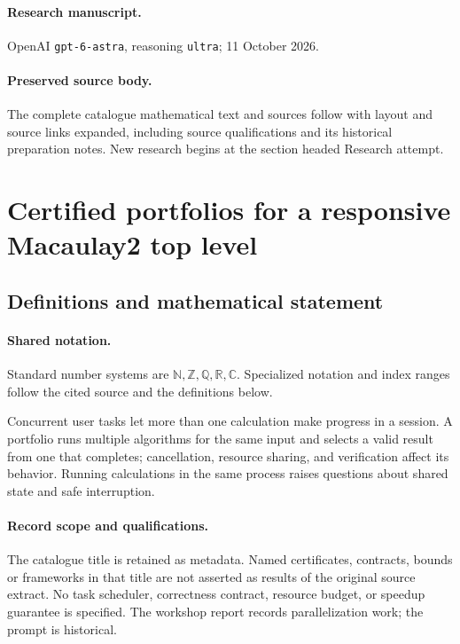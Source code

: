 \documentclass[11pt]{article}
\begin{document}
\paragraph{Research manuscript.} OpenAI \texttt{gpt-6-astra}, reasoning \texttt{ultra}; 11 October 2026.
\paragraph{Preserved source body.} The complete catalogue mathematical text and sources follow with layout and source links expanded, including source qualifications and its historical preparation notes. New research begins at the section headed Research attempt.

\section{Certified portfolios for a responsive Macaulay2 top level}\label{statement}

\subsection{Definitions and mathematical statement}

\paragraph{Shared notation.}Standard number systems are $\mathbb N,\mathbb Z,\mathbb Q,\mathbb R,\mathbb C$. Specialized notation and index ranges follow the cited source and the definitions below.


Concurrent user tasks let more than one calculation make progress in a session. A portfolio runs multiple algorithms for the same input and selects a valid result from one that completes; cancellation, resource sharing, and verification affect its behavior. Running calculations in the same process raises questions about shared state and safe interruption.
\paragraph{Record scope and qualifications.}
The catalogue title is retained as metadata. Named certificates, contracts, bounds or frameworks in that title are not asserted as results of the original source extract.
No task scheduler, correctness contract, resource budget, or speedup guarantee is specified. The workshop report records parallelization work; the prompt is historical.
\end{document}
